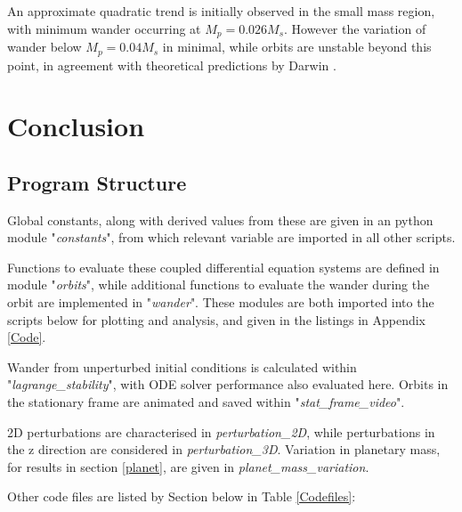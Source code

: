 \documentclass[11pt, a4paper,twocolumn]{article} %
\begin{document}
An approximate quadratic trend is initially observed in the small mass region, with minimum wander occurring at $ M_{p} = 0.026 M_{s}$. However the variation of wander below $ M_{p} = 0.04 M_{s}$ in minimal, while orbits are unstable beyond this point, in agreement with theoretical predictions by Darwin \cite{Darwin1897}.

\section{Conclusion}




\clearpage
\printbibliography

\onecolumn
\begin{appendices}
\section{Program Structure} \label{structure}
Global constants, along with derived values from these are given in an python module "\textit{constants}", from which relevant variable are imported in all other scripts.

Functions to evaluate these coupled differential equation systems are defined in module "\textit{orbits}", while additional functions to evaluate the wander during the orbit are implemented in "\textit{wander}". These modules are both imported into the scripts below for plotting and analysis, and given in the listings in Appendix \ref{Code}.

Wander from unperturbed initial conditions is calculated within "\textit{lagrange\_stability}", with ODE solver performance also evaluated here.
Orbits in the stationary frame are animated and saved within "\textit{stat\_frame\_video}".

2D perturbations are characterised in \textit{perturbation\_2D}, while perturbations in the z direction are considered in \textit{perturbation\_3D}. Variation in planetary mass, for results in section \ref{planet}, are given in \textit{planet\_mass\_variation}.

Other code files are listed by Section below in Table \ref{Codefiles}:


\end{appendices}
\end{document}
